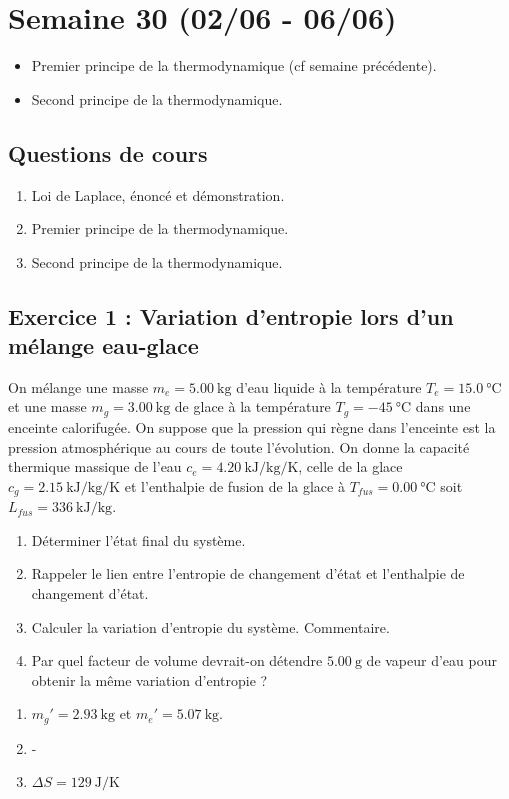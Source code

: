 \section{Semaine 30 (02/06 - 06/06) }


\begin{itemize}
	\item Premier principe de la thermodynamique (cf semaine précédente).
	\item Second principe de la thermodynamique.
\end{itemize}

\subsection{Questions de cours}

\begin{enumerate}
	\item Loi de Laplace, énoncé et démonstration.
	\item Premier principe de la thermodynamique.
	\item Second principe de la thermodynamique.
\end{enumerate}

\subsection{Exercice 1 : Variation d'entropie lors d'un mélange eau-glace}

On mélange une masse $m_e = \SI{5.00}{\kilogram}$ d'eau liquide à la température $T_e = \SI{15.0}{\degreeCelsius}$ et une masse $m_g = \SI{3.00}{\kilogram}$ de glace à la température $T_g = \SI{-45}{\degreeCelsius}$ dans une enceinte calorifugée. On suppose que la pression qui règne dans l'enceinte est la pression atmosphérique au cours de toute l'évolution. On donne la capacité thermique massique de l'eau $c_e = \SI{4.20}{\kilo\joule\per\kilogram\per\kelvin}$, celle de la glace $c_g = \SI{2.15}{\kilo\joule\per\kilogram\per\kelvin}$ et l'enthalpie de fusion de la glace à $T_{fus} = \SI{0.00}{\degreeCelsius}$ soit $L_{fus} = \SI{336}{\kilo\joule\per\kilogram}$.

\begin{enumerate}
	\item Déterminer l'état final du système.
	\item Rappeler le lien entre l'entropie de changement d'état et l'enthalpie de changement d'état.
	\item Calculer la variation d'entropie du système. Commentaire.
	\item Par quel facteur de volume devrait-on détendre $\SI{5.00}{\gram}$ de vapeur d'eau pour obtenir la même variation d'entropie ?
\end{enumerate}


\begin{enumerate}
	\item $m_g' = \SI{2.93}{\kilogram}$ et $m_e' = \SI{5.07}{\kilogram}$.
	\item -
	\item $\Delta S = \SI{129}{\joule\per\kelvin}$
\end{enumerate}